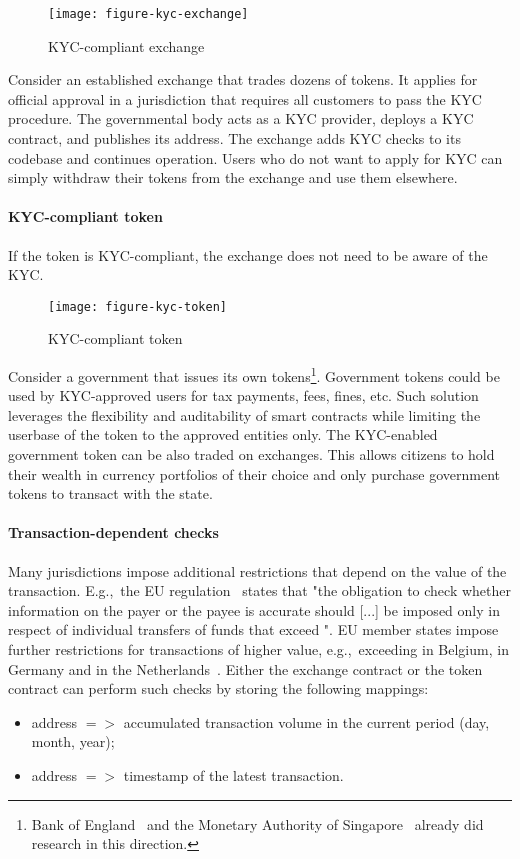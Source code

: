 \begin{figure}[h]
	\caption{KYC-compliant exchange}
	\centering
	\texttt{[image: figure-kyc-exchange]}
\end{figure}

Consider an established exchange that trades dozens of tokens.
It applies for official approval in a jurisdiction that requires all customers to pass the KYC procedure.
The governmental body acts as a KYC provider, deploys a KYC contract, and publishes its address.
The exchange adds KYC checks to its codebase and continues operation.
Users who do not want to apply for KYC can simply withdraw their tokens from the exchange and use them elsewhere.


\paragraph{KYC-compliant token}

If the token is KYC-compliant, the exchange does not need to be aware of the KYC.

\begin{figure}[h]
	\caption{KYC-compliant token}
	\centering
	\texttt{[image: figure-kyc-token]}
\end{figure}

Consider a government that issues its own tokens\footnote{Bank of England~\cite{Danezis2016} and the Monetary Authority of Singapore~\cite{Singapore17} already did research in this direction.}.
Government tokens could be used by KYC-approved users for tax payments, fees, fines, etc.
Such solution leverages the flexibility and auditability of smart contracts while limiting the userbase of the token to the approved entities only.
The KYC-enabled government token can be also traded on exchanges.
This allows citizens to hold their wealth in currency portfolios of their choice and only purchase government tokens to transact with the state.

\paragraph{Transaction-dependent checks}

Many jurisdictions impose additional restrictions that depend on the value of the transaction.
E.g.,~the EU regulation~\cite{EU847} states that "the obligation to check whether information on the payer or the payee is accurate should [...] be imposed only in respect of individual transfers of funds that exceed ".
EU member states impose further restrictions for transactions of higher value, e.g.,~exceeding  in Belgium,  in Germany and in the Netherlands~\cite{PWC2015}.
Either the exchange contract or the token contract can perform such checks by storing the following mappings:
\begin{itemize}
	\item address $=>$ accumulated transaction volume in the current period (day, month, year);
	\item address $=>$ timestamp of the latest transaction. 
\end{itemize}



